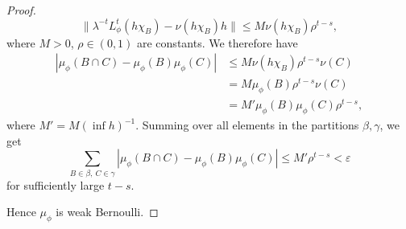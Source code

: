 \begin{theorem}
\begin{proof}
		\[
			\|\lambda^{-t}L_\phi^{t}(h \chi_B) - \nu(h \chi_B)h\| \leq M\nu(h \chi_B)\rho^{t - s},
		\]
		where $M > 0$, $\rho \in (0, 1)$ are constants. We therefore have
		\begin{align*}
			|\mu_\phi(B \cap C) - \mu_\phi(B)\mu_\phi(C)| &\leq M\nu(h \chi_B)\rho^{t - s} \nu(C) \\
				&= M\mu_\phi(B)\rho^{t - s} \nu(C) \\
				&= M'\mu_\phi(B)\mu_\phi(C)\rho^{t - s},
		\end{align*}
		where $M' = M(\inf{h})^{-1}$. Summing over all elements in the partitions $\beta, \gamma$, we get
		\[
			\sum_{B \in \beta,\ C \in \gamma}{|\mu_\phi(B \cap C) - \mu_\phi(B)\mu_\phi(C)|} \leq M'\rho^{t - s} < \varepsilon
		\]
		for sufficiently large $t - s$.
		
		Hence $\mu_\phi$ is weak Bernoulli.
	\end{proof}
\end{theorem}
